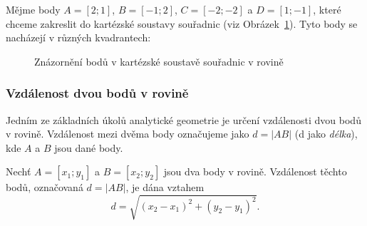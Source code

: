 \begin{example}
    Mějme body $A = [2;1]$, $B = [-1;2]$, $C = [-2;-2]$ a $D = [1;-1]$, které chceme zakreslit do kartézské soustavy souřadnic (viz Obrázek~\ref{fig:cartesian_points}).
    Tyto body se nacházejí v různých kvadrantech:

    \begin{figure}[H]
        \centering
        \caption{Znázornění bodů v kartézské soustavě souřadnic v rovině}
        \label{fig:cartesian_points}
    \end{figure}

\end{example}


\subsubsection{Vzdálenost dvou bodů v rovině}\label{subsubsec:Distance_between_points_in_plane}

Jedním ze základních úkolů analytické geometrie je určení vzdálenosti dvou bodů v rovině.
Vzdálenost mezi dvěma body označujeme jako $d = |AB|$ (d jako \emph{délka}), kde $A$ a $B$ jsou dané body.

\begin{definition}
    Nechť $A = [x_1; y_1]$ a $B = [x_2; y_2]$ jsou dva body v rovině.
    Vzdálenost těchto bodů, označovaná $d = |AB|$, je dána vztahem
    \begin{equation}\label{eq:distance}
        d = \sqrt{(x_2 - x_1)^2 + (y_2 - y_1)^2}.
    \end{equation}
\end{definition}

